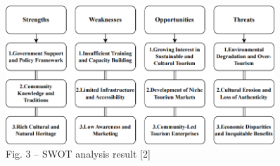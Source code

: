 \begin{figure}[H]
	\centering
	\includegraphics[width=0.9\textwidth]{assets/339}
	\caption*{Fig. 3 -- SWOT analysis result {[}2{]}}
\end{figure}

